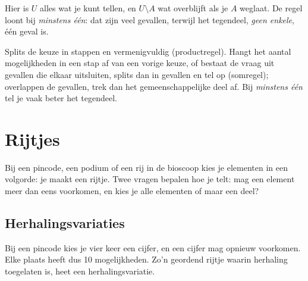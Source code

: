 Hier is $U$ alles wat je kunt tellen, en $U \setminus A$ wat overblijft als je $A$ weglaat. De regel loont bij \textit{minstens één}: dat zijn veel gevallen, terwijl het tegendeel, \textit{geen enkele}, één geval is.


\begin{werkwijze}
Splits de keuze in stappen en vermenigvuldig (productregel). Hangt het aantal mogelijkheden in een stap af van een vorige keuze, of bestaat de vraag uit gevallen die elkaar uitsluiten, splits dan in gevallen en tel op (somregel); overlappen de gevallen, trek dan het gemeenschappelijke deel af. Bij \textit{minstens één} tel je vaak beter het tegendeel.
\end{werkwijze}

\begin{oefeningen}

\end{oefeningen}

\section{Rijtjes}

Bij een pincode, een podium of een rij in de bioscoop kies je elementen in een volgorde: je maakt een rijtje. Twee vragen bepalen hoe je telt: mag een element meer dan eens voorkomen, en kies je alle elementen of maar een deel?

\subsection{Herhalingsvariaties}

Bij een pincode kies je vier keer een cijfer, en een cijfer mag opnieuw voorkomen. Elke plaats heeft dus 10 mogelijkheden. Zo'n geordend rijtje waarin herhaling toegelaten is, heet een herhalingsvariatie.

